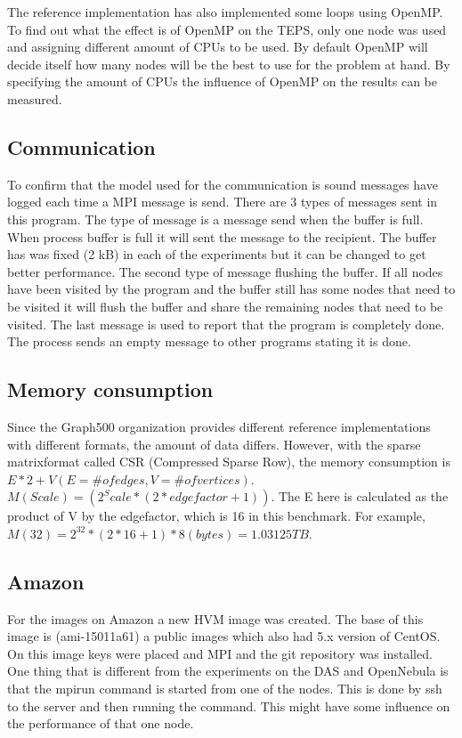 The reference  implementation has also implemented some loops using OpenMP. To find out what the effect is of OpenMP on the TEPS, only one node was used and assigning different amount of CPUs to be used. By default OpenMP will decide itself how many nodes will be the best to use for the problem at hand. By specifying the amount of CPUs the influence of OpenMP on the results can be measured.    

    
\subsection{Communication}
To confirm that the model used for the communication is sound messages have logged each time a MPI message is send. There are 3 types of messages sent in this program. The type of message is a message send when the buffer is full. When process buffer is full it will sent the message to the recipient. The buffer has was fixed (2 kB) in each of the experiments but it can be changed to get better performance. The second type of message flushing the buffer. If all nodes have been visited by the program and the buffer still has some nodes that need to be visited it will flush the buffer and share the remaining nodes that need to be visited. The last message is used to report that the program is completely done. The process sends an empty message to other programs stating it is done.

\subsection{Memory consumption}
Since the Graph500 organization provides different reference implementations with different formats, the amount of data differs. However, with the sparse matrixformat called CSR (Compressed Sparse Row), the memory consumption is $E*2 + V (E = \# of edges, V = \# of vertices)$.
$M(Scale) = (2^Scale *(2*edgefactor + 1))$. The E here is calculated as the product of V by the edgefactor, which is 16 in this benchmark. For
example, $M(32) = 2^32 * (2*16+1) * 8 (bytes) = 1.03125 TB$.
    
\subsection{Amazon}
For the images on Amazon a new HVM image was created. The base of this image is (ami-15011a61) a public images which also had 5.x version of CentOS. On this image keys were placed and MPI and the git repository was installed. One thing that is different from the experiments on the DAS and OpenNebula is that the mpirun command is started from one of the nodes. This is done by ssh to the server and then running the command. This might have some influence on the performance of that one node.

   

     
